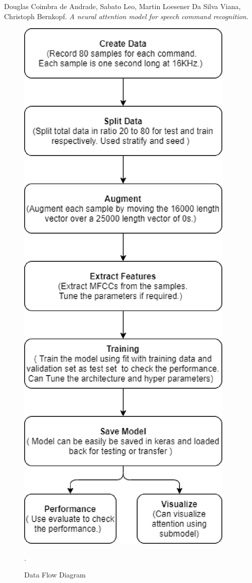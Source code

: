 \documentclass[11pt,english]{article}
\begin{document}
\begin{thebibliography}{9}
Douglas Coimbra de Andrade, Sabato Leo, Martin Loesener Da Silva Viana, Christoph Bernkopf. 
\textit{A neural attention model for speech command recognition}. 

\end{thebibliography}
\begin{figure}[!ht]
\centering
\includegraphics[width=\columnwidth]{./Figs/Flow.eps}
\caption{ Data Flow Diagram}.
\label{fig: Flow}	
\end{figure}
\end{document}
